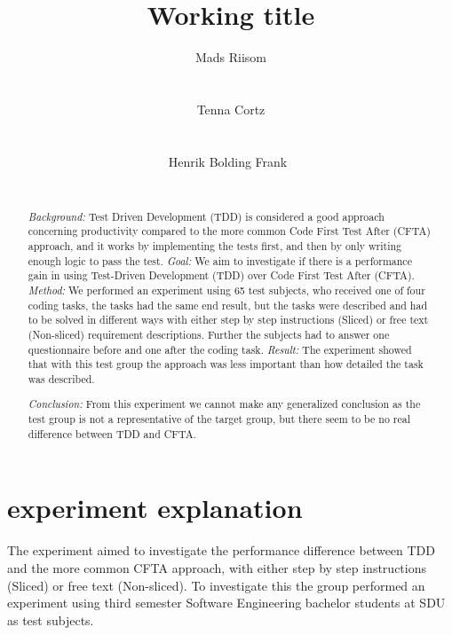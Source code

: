 \documentclass{sig-alternate-05-2015}
\begin{document}
\title{Working title}

\author{
\alignauthor
	Mads Riisom\\
	\\
	\\
\alignauthor
	Tenna Cortz\\
	\\
	\\
\alignauthor
	Henrik Bolding Frank\
	\\
	\\
}

\maketitle
\begin{abstract}
\textit{Background:} Test Driven Development (TDD) is considered a good approach concerning productivity compared to the more common Code First Test After (CFTA) approach, and it works by implementing the tests first, and then by only writing enough logic to pass the test. \textit{Goal:} We aim to investigate if there is a performance gain in using Test-Driven Development (TDD) over Code First Test After (CFTA). \textit{Method:} We performed an experiment using 65 test subjects, who received one of four coding tasks, the tasks had the same end result, but the tasks were described and had to be solved in different ways with either step by step instructions (Sliced) or free text (Non-sliced) requirement descriptions. Further the subjects had to answer one questionnaire before and one after the coding task. \textit{Result:} The experiment showed that with this test group the approach was less important than how detailed the task was described.

\textit{Conclusion:} From this experiment we cannot make any generalized conclusion as the test group is not a representative of the target group, but there seem to be no real difference between TDD and CFTA.

\end{abstract}

\section{experiment explanation}
The experiment aimed to investigate the performance difference between TDD and the more common CFTA approach, with either step by step instructions (Sliced) or free text (Non-sliced). To investigate this the group performed an experiment using third semester Software Engineering bachelor students at SDU as test subjects.
\end{document}
